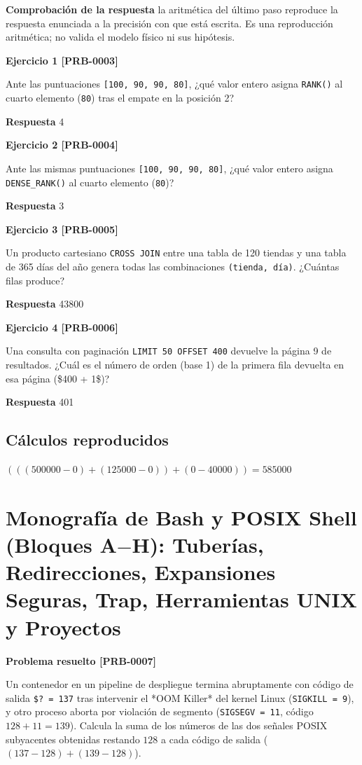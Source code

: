 \documentclass{book}
\begin{document}
\noindent\textbf{Comprobación de la respuesta} la aritmética del último paso reproduce la respuesta enunciada a la precisión con que está escrita. Es una reproducción aritmética; no valida el modelo físico ni sus hipótesis.

\noindent\textbf{Ejercicio 1 [PRB-0003]}

Ante las puntuaciones \texttt{[100, 90, 90, 80]}, ¿qué valor entero asigna \texttt{RANK()} al cuarto elemento (\texttt{80}) tras el empate en la posición 2?

\noindent\textbf{Respuesta} 4

\noindent\textbf{Ejercicio 2 [PRB-0004]}

Ante las mismas puntuaciones \texttt{[100, 90, 90, 80]}, ¿qué valor entero asigna \texttt{DENSE\_RANK()} al cuarto elemento (\texttt{80})?

\noindent\textbf{Respuesta} 3

\noindent\textbf{Ejercicio 3 [PRB-0005]}

Un producto cartesiano \texttt{CROSS JOIN} entre una tabla de 120 tiendas y una tabla de 365 días del año genera todas las combinaciones \texttt{(tienda, d{\'i}a)}. ¿Cuántas filas produce?

\noindent\textbf{Respuesta} 43800

\noindent\textbf{Ejercicio 4 [PRB-0006]}

Una consulta con paginación \texttt{LIMIT 50 OFFSET 400} devuelve la página 9 de resultados. ¿Cuál es el número de orden (base 1) de la primera fila devuelta en esa página (\$400 + 1\$)?

\noindent\textbf{Respuesta} 401

\subsection*{Cálculos reproducidos}

\(\left(\left(\left(500000-0\right)+\left(125000-0\right)\right)+\left(0-40000\right)\right) = 585000\)

\section{Monografía de Bash y POSIX Shell (Bloques A\(-\)H): Tuberías, Redirecciones, Expansiones Seguras, Trap, Herramientas UNIX y Proyectos}

\noindent\textbf{Problema resuelto [PRB-0007]}

Un contenedor en un pipeline de despliegue termina abruptamente con código de salida \texttt{\$? = 137} tras intervenir el *OOM Killer* del kernel Linux (\texttt{SIGKILL = 9}), y otro proceso aborta por violación de segmento (\texttt{SIGSEGV = 11}, código \(128 + 11 = 139\)). Calcula la suma de los números de las dos señales POSIX subyacentes obtenidas restando \(128\) a cada código de salida (\((137 - 128) + (139 - 128)\)).
\end{document}
